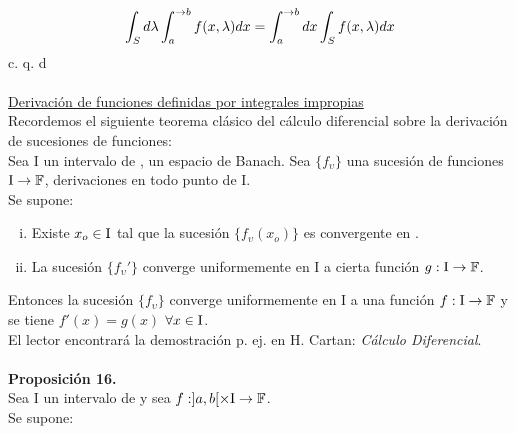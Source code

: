 \begin{equation}
\int_S d\lambda \int_a^{\to b}f(x,\lambda) dx=\int_a^{\to b}dx\int_S f(x,\lambda) dx
\end{equation}
\phantom{separado para que funcione bine jajajajajajaa xd xd} c. q. d \\ \\
\underline{Derivación de funciones definidas por integrales impropias}\\
Recordemos el siguiente teorema clásico del cálculo diferencial sobre la derivación de sucesiones de funciones: \\
Sea $\mathrm{I}$ un intervalo de \R , \F \phantom{} un espacio de Banach. Sea $\lbrace f_\upsilon \rbrace$ una sucesión de funciones $\mathrm{I} \rightarrow \mathbb{F}$, derivaciones en todo punto de $\mathrm{I}$. 	\\
Se supone:\\
\begin{enumerate}[i)]
\item Existe $x_o \in \mathrm{I}$ tal que la sucesión $\lbrace f_\upsilon (x_o) \rbrace$ es convergente en \F .
\item La sucesión $\lbrace f_\upsilon' \rbrace$ converge uniformemente en $\mathrm{I}$ a cierta función $g:\mathrm{I}\rightarrow \mathbb{F}$.
\end{enumerate}
Entonces la sucesión $\lbrace f_\upsilon \rbrace$ converge uniformemente en $\mathrm{I}$ a una función $f:\mathrm{I} \rightarrow \mathbb{F}$ y se tiene $f'(x)=g(x)$ $\forall x \in \mathrm{I}$.\\
El lector encontrará la demostración p. ej. en H. Cartan: \textit{Cálculo Diferencial}.\\ \\
\textbf{Proposición 16.}\\
Sea $\mathrm{I}$ un intervalo de \R \phantom{} y sea $f:]a,b[ \times \mathrm{I} \rightarrow \mathbb{F}$.\\
Se supone:
